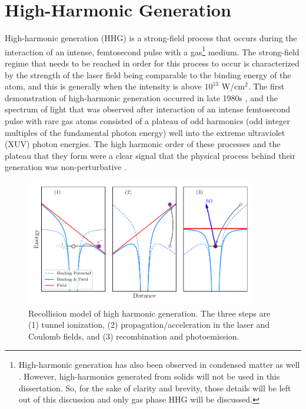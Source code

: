 \section{High-Harmonic Generation}
\label{intro_HHG}


High-harmonic generation (HHG) is a strong-field process that occurs during the interaction of an intense, femtosecond pulse with a gas\footnote{High-harmonic generation has also been observed in condensed matter as well \cite{ghimireObservationHighorderHarmonic2011}. However, high-harmonics generated from solids will not be used in this dissertation.  So, for the sake of clarity and brevity, those details will be left out of this discussion and only gas phase HHG will be discussed.} medium.  The strong-field regime that needs to be reached in order for this process to occur is characterized by the strength of the laser field being comparable to the binding energy of the atom, and this is generally when the intensity is above $10^{13}$ W/cm$^{2}$.  The first demonstration of high-harmonic generation occurred in late 1980s \cite{mcphersonStudiesMultiphotonProduction1987, liMultipleharmonicGenerationRare1989}, and the spectrum of light that was observed after interaction of an intense femtosecond pulse with rare gas atoms consisted of a plateau of odd harmonics (odd integer multiples of the fundamental photon energy) well into the extreme ultraviolet (XUV) photon energies.  The high harmonic order of these processes and the plateau that they form were a clear signal that the physical process behind their generation was non-perturbative \cite{boydNonlinearOptics2008}.  

\begin{figure}
	\centering
	\includegraphics[width=0.9\textwidth]{figures/Introduction/3-step.pdf}
	\caption[Recollision model of high harmonic generation]{Recollision model of high harmonic generation.  The three steps are (1) tunnel ionization, (2) propagation/acceleration in the laser and Coulomb fields, and (3) recombination and photoemission.}
	\label{fig:3-step}
\end{figure}

